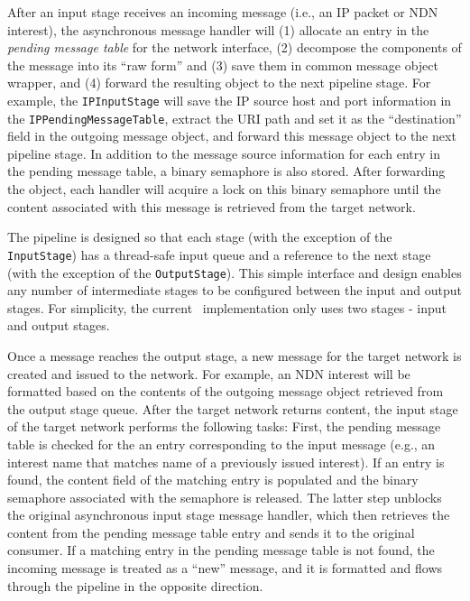 After an input stage receives an incoming message (i.e., an IP packet or NDN interest), the asynchronous message handler will (1) allocate an entry in the \emph{pending message table} for the network interface, (2) decompose the components of the message into its ``raw form'' and (3) save them in common message object wrapper, and (4) forward the resulting object to the next pipeline stage. For example, the {\tt IPInputStage} will save the IP source host and port information in the {\tt IPPendingMessageTable}, extract the URI path and set it as the ``destination'' field in the outgoing message object, and forward this message object to the next pipeline stage. In addition to the message source information for each entry in the pending message table, a binary semaphore is also stored. After forwarding the object, each handler will acquire a lock on this binary semaphore until the content associated with this message is retrieved from the target network. 

The pipeline is designed so that each stage (with the exception of the {\tt InputStage}) has a thread-safe input queue and a reference to the next stage (with the exception of the {\tt OutputStage}). This simple interface and design enables any number of intermediate stages to be configured between the input and output stages. For simplicity, the current \sink\ implementation only uses two stages - input and output stages. 

Once a message reaches the output stage, a new message for the target network is created and issued to the network. For example, an NDN interest will be formatted based on the contents of the outgoing message object retrieved from the output stage queue. After the target network returns content, the input stage of the target network performs the following tasks: First, the pending message table is checked for the an entry corresponding to the input message (e.g., an interest name that matches name of a previously issued interest). If an entry is found, the content field of the matching entry is populated and the binary semaphore associated with the semaphore is released. The latter step unblocks the original asynchronous input stage message handler, which then retrieves the content from the pending message table entry and sends it to the original consumer. If a matching entry in the pending message table is not found, the incoming message is treated as a ``new'' message, and it is formatted and flows through the pipeline in the opposite direction. 


